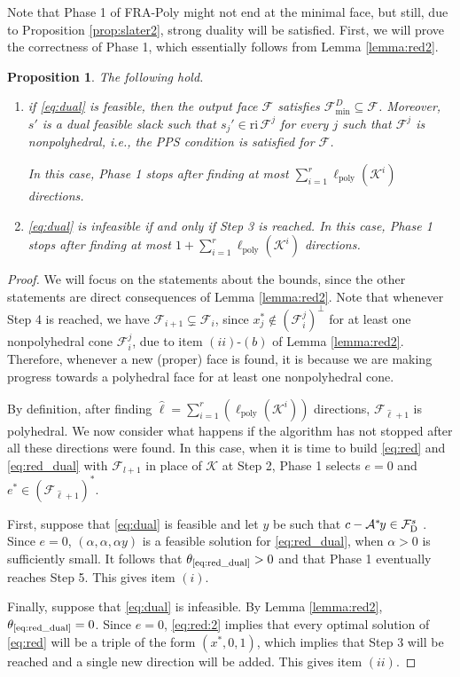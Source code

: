 \documentclass{article}
\newcommand{\reInt}{\mathrm{ri}\,}
\newcommand{\feasS}{\mathcal{F}_{\text{D }}^s}
\newcommand{\minFaceD}{ {\mathcal{F}_{\min}^D}}
\newcommand{\stdMap}{ {\mathcal{A}}}
\newcommand{\stdCone}{ {\mathcal{K}}}
\newcommand{\stdFace}{ \mathcal{F}}
\newcommand{\stdInt}{ {e}}
\newcommand{\opt}[1]{ {\theta _{#1}}}
\newcommand{\distP}{\ell _{\text{poly}}}
\newcommand{\T}{\ast\hspace{-1pt}}
\newtheorem{proposition}[definition]{Proposition}
\begin{document}
Note that Phase 1 of FRA-Poly might not end at the minimal face, but still, 
due to Proposition \ref{prop:slater2}, strong 
duality will be satisfied. First, we will prove the correctness of Phase 1, 
which essentially follows from Lemma \ref{lemma:red2}.
\begin{proposition}\label{prop:phase1}
The following hold.
\begin{enumerate}[label=(\roman*)]
	\item if \eqref{eq:dual} is feasible, then the output face $\stdFace$ satisfies 
	$\minFaceD \subseteq \stdFace$. Moreover, $s'$ is a dual 
feasible slack such that $s_j' \in \reInt \stdFace ^j $  for every $j$ such that $\stdFace ^j$  is nonpolyhedral, i.e., the PPS condition is satisfied for $\stdFace$.

In this case, Phase 1  stops after finding at most $\sum _{i=1}^{r} \distP(\stdCone ^i) $ directions. 
	\item \eqref{eq:dual} is infeasible if and only if Step 3 is reached. In this case, Phase 1 stops after finding 
	at most $1+ \sum _{i=1}^{r} \distP(\stdCone ^i) $ directions.
\end{enumerate}
\end{proposition}
\begin{proof}
We will focus on the statements about the bounds, since the other statements 
are direct consequences of 
Lemma \ref{lemma:red2}. Note that whenever Step 4 is reached, we have 
$\stdFace _{i+1} \subsetneq \stdFace _i$, since 
$x^*_j \not \in (\stdFace _i^j)^\perp$ for at least one nonpolyhedral cone $\stdFace _i^j$, due to item $(ii)$-$(b)$ of Lemma \ref{lemma:red2}. 
Therefore, whenever a new (proper) face is found, it is because 
we are making progress towards a polyhedral face for at least one nonpolyhedral cone. 	
	
By definition, after finding $\hat \ell = \sum _{i=1}^{r} (\distP(\stdCone ^i)) $ directions, 
$\stdFace _{\hat \ell + 1}$ is polyhedral. We now consider what happens if 
the algorithm has not stopped after all these directions were found.
In this case, when it is time to build \eqref{eq:red} and \eqref{eq:red_dual} with $\stdFace_{l+1}$ in
place of $\stdCone$ at Step 2, Phase 1 selects $e = 0$ and $\stdInt^* \in (\stdFace _{\hat \ell + 1})^*$.

First, suppose that \eqref{eq:dual} is feasible and  let 
$y$ be such that $c-\stdMap^\T y \in \feasS$. 
Since $\stdInt = 0$, $(\alpha, \alpha, \alpha y)$
is a feasible solution for \eqref{eq:red_dual}, when $\alpha>0$ is sufficiently small. It follows 
that $\opt{\text{\ref{eq:red_dual}}} > 0$ and that Phase 1 eventually reaches Step 5. This gives item $(i)$.



Finally, suppose that \eqref{eq:dual} is infeasible. By Lemma \ref{lemma:red2},  $\opt{\text{\ref{eq:red_dual}}} = 0$. Since $\stdInt = 0$,  \eqref{eq:red:2} implies that every optimal solution of 
\eqref{eq:red} will be a triple of the form
$(x^*,0,1)$, which implies that Step 3 will be reached and a single new direction will be 
added. This gives  item $(ii)$.
\end{proof}
	
\end{document}
